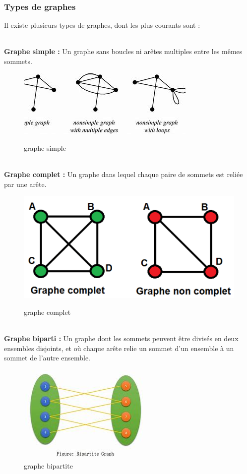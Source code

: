 \newpage
\subsubsection{Types de graphes}

Il existe plusieurs types de graphes, dont les plus courants sont :

\\
     \textbf{Graphe simple :} Un graphe sans boucles ni arêtes multiples entre les mêmes sommets.
\begin{figure}[h]
    \centering
    \includegraphics[width=0.4\linewidth]{Images/simple_graph.jpeg}
    \caption{graphe simple}
    \cite{graph_image3}
    \end{figure}
     
  \\   \textbf{Graphe complet :} Un graphe dans lequel chaque paire de sommets est reliée par une arête.

    \begin{figure}[h]
    \centering
    \includegraphics[width=0.4\linewidth]{Images/graph_simple_complet.png}
    \caption{graphe complet}
    
    \cite{graph_image4}
\end{figure}
    
  \\  \textbf{Graphe biparti :} Un graphe dont les sommets peuvent être divisés en deux ensembles disjoints, et où chaque arête relie un sommet d'un ensemble à un sommet de l'autre ensemble.

\begin{figure}[h]
    \centering
    \includegraphics[width=0.4\linewidth]{Images/bipartite_graph.jpeg}
    \caption{graphe bipartite}
\end{figure}





